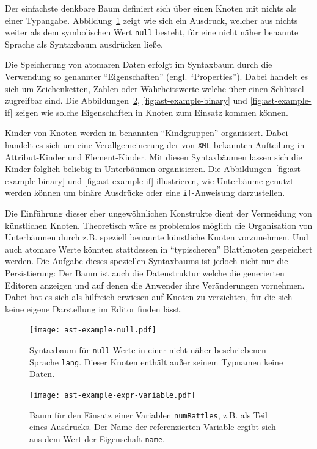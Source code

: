 \documentclass[paper=a4,fontsize=11pt,parskip=half]{scrartcl}
\begin{document}
Der einfachste denkbare Baum definiert sich über einen Knoten mit nichts als einer Typangabe. Abbildung~\ref{fig:ast-example-null} zeigt wie sich ein Ausdruck, welcher aus nichts weiter als dem symbolischen Wert \texttt{null} besteht, für eine nicht näher benannte Sprache als Syntaxbaum ausdrücken ließe.

Die Speicherung von atomaren Daten erfolgt im Syntaxbaum durch die Verwendung so genannter \enquote{Eigenschaften} (engl. \enquote{Properties}). Dabei handelt es sich um Zeichenketten, Zahlen oder Wahrheitswerte welche über einen Schlüssel zugreifbar sind. Die Abbildungen~\ref{fig:ast-example-variable}, \ref{fig:ast-example-binary} und \ref{fig:ast-example-if} zeigen wie solche Eigenschaften in Knoten zum Einsatz kommen können.

Kinder von Knoten werden in benannten \enquote{Kindgruppen} organisiert. Dabei handelt es sich um eine Verallgemeinerung der von \texttt{XML} bekannten Aufteilung in Attribut-Kinder und Element-Kinder. Mit diesen Syntaxbäumen lassen sich die Kinder folglich beliebig in Unterbäumen organisieren. Die Abbildungen~\ref{fig:ast-example-binary} und \ref{fig:ast-example-if} illustrieren, wie Unterbäume genutzt werden können um binäre Ausdrücke oder eine \texttt{if}-Anweisung darzustellen.

Die Einführung dieser eher ungewöhnlichen Konstrukte dient der Vermeidung von künstlichen Knoten. Theoretisch wäre es problemlos möglich die Organisation von Unterbäumen durch z.B. speziell benannte künstliche Knoten vorzunehmen. Und auch atomare Werte könnten stattdessen in \enquote{typischeren} Blattknoten gespeichert werden. Die Aufgabe dieses speziellen Syntaxbaums ist jedoch nicht nur die Persistierung: Der Baum ist auch die Datenstruktur welche die generierten Editoren anzeigen und auf denen die Anwender ihre Veränderungen vornehmen. Dabei hat es sich als hilfreich erwiesen auf Knoten zu verzichten, für die sich keine eigene Darstellung im Editor finden lässt.

\begin{figure}[p]
  \centering\texttt{[image: ast-example-null.pdf]}
  \caption{Syntaxbaum für \texttt{null}-Werte in einer nicht näher beschriebenen Sprache \texttt{lang}. Dieser Knoten enthält außer seinem Typnamen keine Daten.}
  \label{fig:ast-example-null}
\end{figure}

\begin{figure}[p]
  \centering\texttt{[image: ast-example-expr-variable.pdf]}
  \caption{Baum für den Einsatz einer Variablen \texttt{numRattles}, z.B. als Teil eines Ausdrucks. Der Name der referenzierten Variable ergibt sich aus dem Wert der Eigenschaft \texttt{name}.}
  \label{fig:ast-example-variable}
\end{figure}
\end{document}
